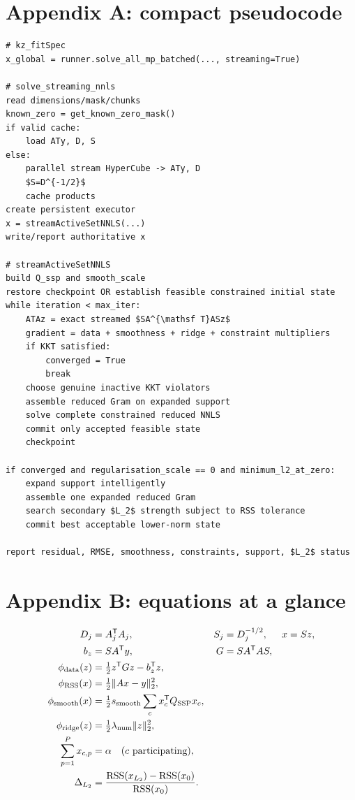 \documentclass[10pt,a4paper]{article}
\begin{document}
\section{Appendix A: compact pseudocode}
\begin{lstlisting}
# kz_fitSpec
x_global = runner.solve_all_mp_batched(..., streaming=True)

# solve_streaming_nnls
read dimensions/mask/chunks
known_zero = get_known_zero_mask()
if valid cache:
    load ATy, D, S
else:
    parallel stream HyperCube -> ATy, D
    $S=D^{-1/2}$
    cache products
create persistent executor
x = streamActiveSetNNLS(...)
write/report authoritative x

# streamActiveSetNNLS
build Q_ssp and smooth_scale
restore checkpoint OR establish feasible constrained initial state
while iteration < max_iter:
    ATAz = exact streamed $SA^{\mathsf T}ASz$
    gradient = data + smoothness + ridge + constraint multipliers
    if KKT satisfied:
        converged = True
        break
    choose genuine inactive KKT violators
    assemble reduced Gram on expanded support
    solve complete constrained reduced NNLS
    commit only accepted feasible state
    checkpoint

if converged and regularisation_scale == 0 and minimum_l2_at_zero:
    expand support intelligently
    assemble one expanded reduced Gram
    search secondary $L_2$ strength subject to RSS tolerance
    commit best acceptable lower-norm state

report residual, RMSE, smoothness, constraints, support, $L_2$ status
\end{lstlisting}

\section{Appendix B: equations at a glance}
\begin{align*}
D_j &= A_j^{\mathsf T}A_j, & S_j&=D_j^{-1/2}, & x&=Sz,\\
b_z &= SA^{\mathsf T}y, & G&=SA^{\mathsf T}AS,\\
\phi_{\rm data}(z)&=\tfrac{1}{2}z^{\mathsf T}Gz-b_z^{\mathsf T}z,\\
\phi_{\rm RSS}(x)&=\tfrac{1}{2}\lVert Ax-y\rVert_2^2,\\
\phi_{\rm smooth}(x)&=\tfrac{1}{2}s_{\rm smooth}\sum_c x_c^{\mathsf T}Q_{\rm SSP}x_c,\\
\phi_{\rm ridge}(z)&=\tfrac{1}{2}\lambda_{\rm num}\lVert z\rVert_2^2,\\
\sum_{p=1}^{P}x_{c,p}&=\alpha \quad (c\text{ participating}),\\
\Delta_{L_2}&=\frac{\mathrm{RSS}(x_{L_2})-\mathrm{RSS}(x_0)}{\mathrm{RSS}(x_0)}.
\end{align*}
\end{document}
